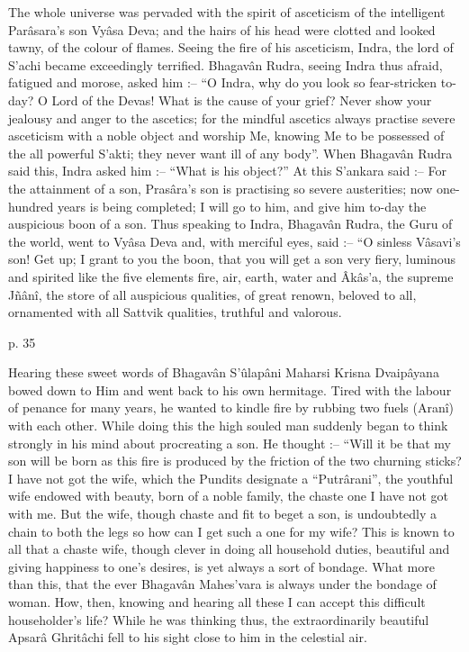 The whole universe was pervaded with the spirit of asceticism of the intelligent Parâsara's son Vyâsa Deva; and the hairs of his head were clotted and looked tawny, of the colour of flames. Seeing the fire of his asceticism, Indra, the lord of S’achi became exceedingly terrified. Bhagavân Rudra, seeing Indra thus afraid, fatigued and morose, asked him :-- “O Indra, why do you look so fear-stricken to-day? O Lord of the Devas! What is the cause of your grief? Never show your jealousy and anger to the ascetics; for the mindful ascetics always practise severe asceticism with a noble object and worship Me, knowing Me to be possessed of the all powerful S’akti; they never want ill of any body”. When Bhagavân Rudra said this, Indra asked him :-- “What is his object?” At this S’ankara said :-- For the attainment of a son, Prasâra's son is practising so severe austerities; now one-hundred years is being completed; I will go to him, and give him to-day the auspicious boon of a son. Thus speaking to Indra, Bhagavân Rudra, the Guru of the world, went to Vyâsa Deva and, with merciful eyes, said :-- “O sinless Vâsavi's son! Get up; I grant to you the boon, that you will get a son very fiery, luminous and spirited like the five elements fire, air, earth, water and Âkâs'a, the supreme Jñânî, the store of all auspicious qualities, of great renown, beloved to all, ornamented with all Sattvik qualities, truthful and valorous.

 

p. 35

 

Hearing these sweet words of Bhagavân S’ûlapâni Maharsi Krisna Dvaipâyana bowed down to Him and went back to his own hermitage. Tired with the labour of penance for many years, he wanted to kindle fire by rubbing two fuels (Aranî) with each other. While doing this the high souled man suddenly began to think strongly in his mind about procreating a son. He thought :-- “Will it be that my son will be born as this fire is produced by the friction of the two churning sticks? I have not got the wife, which the Pundits designate a “Putrârani”, the youthful wife endowed with beauty, born of a noble family, the chaste one I have not got with me. But the wife, though chaste and fit to beget a son, is undoubtedly a chain to both the legs so how can I get such a one for my wife? This is known to all that a chaste wife, though clever in doing all household duties, beautiful and giving happiness to one's desires, is yet always a sort of bondage. What more than this, that the ever Bhagavân Mahes'vara is always under the bondage of woman. How, then, knowing and hearing all these I can accept this difficult householder's life? While he was thinking thus, the extraordinarily beautiful Apsarâ Ghritâchi fell to his sight close to him in the celestial air.

